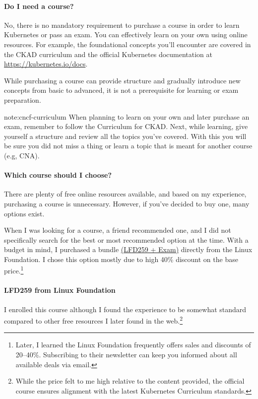 \paragraph{Do I need a course?} No, there is no mandatory requirement to purchase a course in order to learn Kubernetes or pass an exam. You can effectively learn on your own using online resources. For example, the foundational concepts you'll encounter are covered in the CKAD curriculum\cite{cncf-curriculum} and the official Kubernetes documentation at \href{https://kubernetes.io/docs}{https://kubernetes.io/docs}.

While purchasing a course can provide structure and gradually introduce new concepts from basic to advanced, it is not a prerequisite for learning or exam preparation.

\begin{note}{note:cncf-curriculum}
	When planning to learn on your own and later purchase an exam, remember to follow the Curriculum for CKAD\cite{cncf-curriculum}. Next, while learning, give yourself a structure and review all the topics you've covered. With this you will be sure you did not miss a thing or learn a topic that is meant for another course (e.g, CNA).
\end{note}


\paragraph{Which course should I choose?}  
There are plenty of free online resources available, and based on my experience, purchasing a course is unnecessary. However, if you’ve decided to buy one, many options exist.  

When I was looking for a course, a friend recommended one, and I did not specifically search for the best or most recommended option at the time. With a budget in mind, I purchased a bundle \href{https://trainingportal.linuxfoundation.org/collections/kubernetes-developer}{(LFD259 + Exam)} directly from the Linux Foundation. I chose this option mostly due to high 40\% discount on the base price.\footnote{Later, I learned the Linux Foundation frequently offers sales and discounts of 20–40\%. Subscribing to their newsletter can keep you informed about all available deals via email.}


\paragraph{LFD259 from Linux Foundation} I enrolled this course  although I found the experience to be somewhat standard compared to other free resources I later found in the web.\footnote{While the price felt to me high relative to the content provided, the official course ensures alignment with the latest Kubernetes Curriculum standards.}

